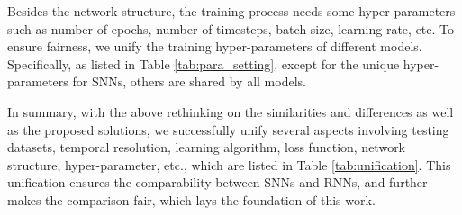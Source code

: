 \documentclass[journal,10pt,twocolumn]{IEEETran}
\begin{document}
Besides the network structure, the training process needs some hyper-parameters such as number of epochs, number of timesteps, batch size, learning rate, etc. To ensure fairness, we unify the training hyper-parameters of different models. Specifically, as listed in Table \ref{tab:para_setting}, except for the unique hyper-parameters for SNNs, others are shared by all models.

\begin{table}[!htbp]
\caption{Hyper-parameter setting.}
\label{tab:para_setting}
\vspace{2pt}
\centering
\renewcommand\arraystretch{1.3}
\end{table}

In summary, with the above rethinking on the similarities and differences as well as the proposed solutions, we successfully unify several aspects involving testing datasets, temporal resolution, learning algorithm, loss function, network structure, hyper-parameter, etc., which are listed in Table \ref{tab:unification}. This unification ensures the comparability between SNNs and RNNs, and further makes the comparison fair, which lays the foundation of this work. 
\end{document}

